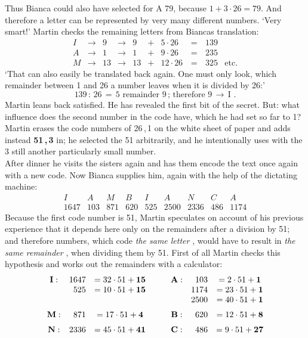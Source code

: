Thus Bianca could also have selected for A 79, because \(1+3\cdot 26=79 \). 
And therefore a letter can be represented by very many different numbers. 
`Very smart!' Martin checks the remaining letters from Biancas translation: 
\[
\begin{array}{cccclccccl}
I & \longrightarrow & 9 & \longrightarrow  & 9  & + & 5\cdot 26 & \,=\, &  139 \\
A & \longrightarrow & 1 & \longrightarrow  & 1  & + & 9\cdot 26 & \,=\, &  235 \\
M & \longrightarrow & 13 & \longrightarrow & 13 & + & 12\cdot 26 & \,=\, & 325 & \mbox{etc.}
\end{array} 
\]
`That can also easily be translated back again. 
One must only look, which remainder between 1 and 26 a number leaves when it is divided by 26:' 
\[
139\,:\,26\,=\,5\,\,\mbox{remainder} \,\,9\,; \,\mbox{therefore}\,\,9\,\longrightarrow
\,\mbox{I}\,\,.
\]
Martin leans back satisfied. 
He has revealed the first bit of the secret. 
But: what influence does the second number in the code have, which he had set so far to 1?
Martin erases the code numbers of 26\,,\,1 on the white sheet of paper and adds instead {\bf 51\,,\,3} in; 
he selected the 51 arbitrarily, and he intentionally uses with the 3 still another particularly small number. \\ 
After dinner he visits the sisters again and has them encode the text once again with a new code.
Now Bianca supplies him, again with the help of the dictating machine: 
\[
\begin{array}{cccccccccccc}
I & A & M & B & I & A & N & C & A \\
1647 & 103 & 871 & 620 & 525 & 2500 & 2336 & 486 & 1174
\end{array} 
\]
Because the first code number is 51, Martin speculates on account of his previous experience that 
it depends here only on the remainders after a division by 51;
and therefore numbers, which code {\em the same letter \/}, would have to result in {\em the same remainder \/}, 
when dividing them by 51. 
First of all Martin checks this hypothesis and works out the remainders with a calculator: 
\[\begin{array}{crccrc}
{\bf I}: & 1647 & = 32\cdot 51 + {\bf 15} \qquad & {\bf A}: & 103  & = 2\cdot 51 + {\bf 1} \\
         & 525  & = 10\cdot 51 + {\bf 15} \qquad &          & 1174 & = 23\cdot 51 + {\bf 1} \\ 
         &      &                                &          & 2500 & = 40\cdot 51 + {\bf 1} \\*[+6pt]
{\bf M}: & 871 & = 17\cdot 51 + {\bf 4} \qquad & {\bf B}: & 620 & = 12\cdot 51 + {\bf 8}  \\*[+6pt] 
{\bf N}: & 2336 & = 45\cdot 51 + {\bf 41} \qquad & {\bf C}: & 486 & = 9\cdot 51 + {\bf 27} 
\end{array} \]
